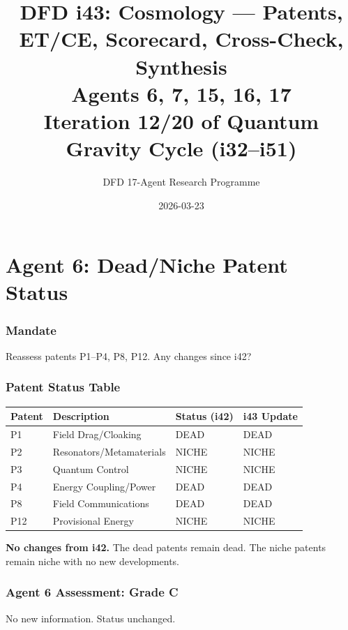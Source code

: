 \documentclass[11pt,a4paper]{article}
\title{DFD i43: Cosmology --- Patents, ET/CE, Scorecard, Cross-Check, Synthesis\\[6pt]
\large Agents 6, 7, 15, 16, 17\\[6pt]
\normalsize Iteration 12/20 of Quantum Gravity Cycle (i32--i51)}
\author{DFD 17-Agent Research Programme}
\date{2026-03-23}
\begin{document}
\maketitle
\tableofcontents
\newpage

\part{Agent 6: Dead/Niche Patent Status}
\label{part:agent6}

\section{Mandate}

Reassess patents P1--P4, P8, P12. Any changes since i42?

\section{Patent Status Table}

\begin{center}
\begin{tabular}{llll}
\toprule
\textbf{Patent} & \textbf{Description} & \textbf{Status (i42)} & \textbf{i43 Update} \\
\midrule
P1 & Field Drag/Cloaking & DEAD & DEAD \\
P2 & Resonators/Metamaterials & NICHE & NICHE \\
P3 & Quantum Control & NICHE & NICHE \\
P4 & Energy Coupling/Power & DEAD & DEAD \\
P8 & Field Communications & DEAD & DEAD \\
P12 & Provisional Energy & NICHE & NICHE \\
\bottomrule
\end{tabular}
\end{center}

\textbf{No changes from i42.} The dead patents remain dead. The niche patents remain niche with no new developments.

\section{Agent 6 Assessment: Grade C}

No new information. Status unchanged.
\end{document}
